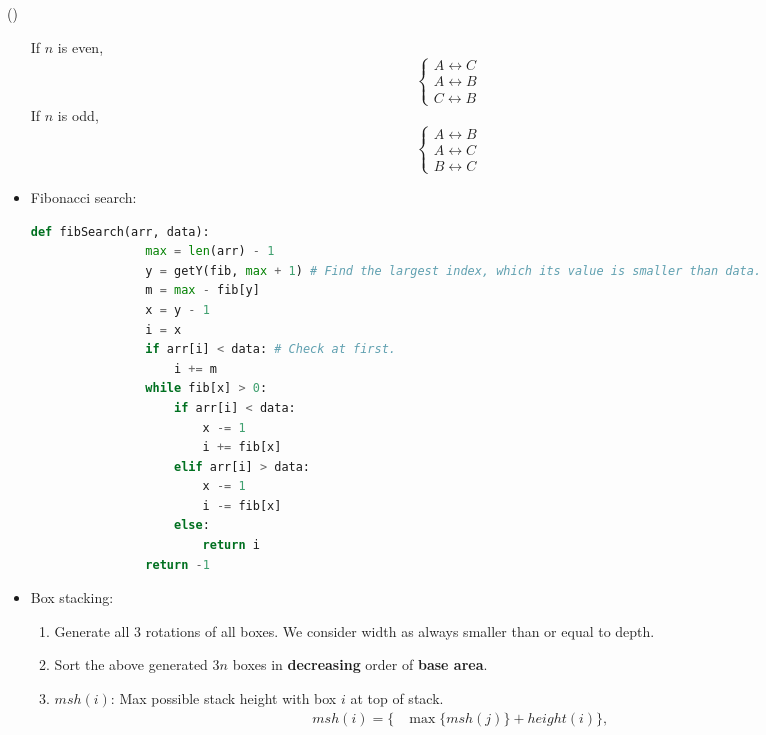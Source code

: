 \begin{theorem}{()}
\begin{itemize}
        If $n$ is even, \begin{equation}
            \begin{cases}
                A \leftrightarrow C \\
                A \leftrightarrow B \\
                C \leftrightarrow B
            \end{cases} 
        \end{equation} If $n$ is odd, \begin{equation}
            \begin{cases}
                A \leftrightarrow B \\
                A \leftrightarrow C \\
                B \leftrightarrow C
            \end{cases} 
        \end{equation}
        \item Fibonacci search: \begin{lstlisting}[caption={Fibonacci search.}, captionpos=b, language=Python]
            def fibSearch(arr, data):
                max = len(arr) - 1
                y = getY(fib, max + 1) # Find the largest index, which its value is smaller than data.
                m = max - fib[y] 
                x = y - 1
                i = x
                if arr[i] < data: # Check at first.
                    i += m
                while fib[x] > 0:
                    if arr[i] < data:
                        x -= 1
                        i += fib[x]
                    elif arr[i] > data:
                        x -= 1
                        i -= fib[x]
                    else:
                        return i
                return -1
        \end{lstlisting}
        \item Box stacking: \begin{enumerate}
            \item Generate all $3$ rotations of all boxes. We consider width as always smaller than or equal to depth.
            \item Sort the above generated $3n$ boxes in \textbf{decreasing} order of \textbf{base area}.
            \item $msh(i)$: Max possible stack height with box $i$ at top of stack. \begin{equation}
                \begin{aligned}
                    msh(i) = \{& \max \{msh(j)\} + height(i)\}, \\ 

\end{aligned}
\end{equation}
\end{enumerate}
\end{itemize}
\end{theorem}
